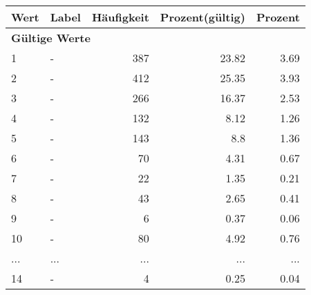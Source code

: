     \begin{longtable}{lXrrr}
     \toprule
     \textbf{Wert} & \textbf{Label} & \textbf{Häufigkeit} & \textbf{Prozent(gültig)} & \textbf{Prozent} \\
     \endhead
     \midrule
     \multicolumn{5}{l}{\textbf{Gültige Werte}}\\
        1 & \multicolumn{1}{X}{-} & %
          \num{387} &
          \num[round-mode=places,round-precision=2]{23.82} &
          \num[round-mode=places,round-precision=2]{3.69} \\
        2 & \multicolumn{1}{X}{-} & %
          \num{412} &
          \num[round-mode=places,round-precision=2]{25.35} &
          \num[round-mode=places,round-precision=2]{3.93} \\
        3 & \multicolumn{1}{X}{-} & %
          \num{266} &
          \num[round-mode=places,round-precision=2]{16.37} &
          \num[round-mode=places,round-precision=2]{2.53} \\
        4 & \multicolumn{1}{X}{-} & %
          \num{132} &
          \num[round-mode=places,round-precision=2]{8.12} &
          \num[round-mode=places,round-precision=2]{1.26} \\
        5 & \multicolumn{1}{X}{-} & %
          \num{143} &
          \num[round-mode=places,round-precision=2]{8.8} &
          \num[round-mode=places,round-precision=2]{1.36} \\
        6 & \multicolumn{1}{X}{-} & %
          \num{70} &
          \num[round-mode=places,round-precision=2]{4.31} &
          \num[round-mode=places,round-precision=2]{0.67} \\
        7 & \multicolumn{1}{X}{-} & %
          \num{22} &
          \num[round-mode=places,round-precision=2]{1.35} &
          \num[round-mode=places,round-precision=2]{0.21} \\
        8 & \multicolumn{1}{X}{-} & %
          \num{43} &
          \num[round-mode=places,round-precision=2]{2.65} &
          \num[round-mode=places,round-precision=2]{0.41} \\
        9 & \multicolumn{1}{X}{-} & %
          \num{6} &
          \num[round-mode=places,round-precision=2]{0.37} &
          \num[round-mode=places,round-precision=2]{0.06} \\
        10 & \multicolumn{1}{X}{-} & %
          \num{80} &
          \num[round-mode=places,round-precision=2]{4.92} &
          \num[round-mode=places,round-precision=2]{0.76} \\
       ... & ... & ... & ... & ... \\
        14 & \multicolumn{1}{X}{-} & %
          \num{4} &
          \num[round-mode=places,round-precision=2]{0.25} &
          \num[round-mode=places,round-precision=2]{0.04} \\


\end{longtable}
